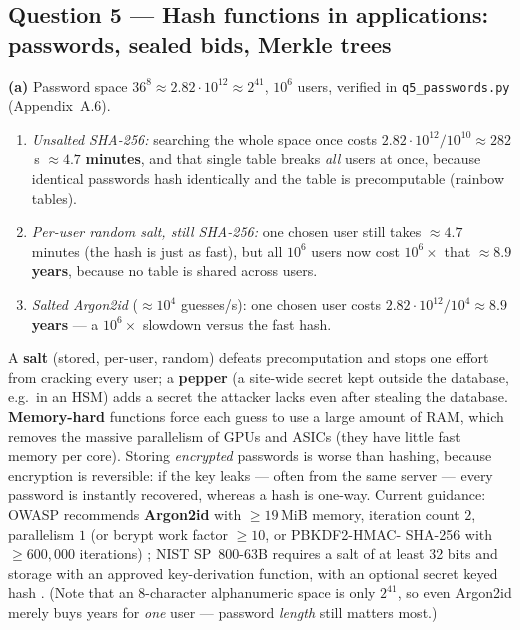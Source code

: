 \documentclass[11pt,a4paper]{article}
\begin{document}
\subsection*{Question 5 --- Hash functions in applications: passwords, sealed bids, Merkle trees}
\textbf{(a)} Password space $36^{8}\approx 2.82\cdot 10^{12}\approx 2^{41}$, $10^{6}$ users, verified in
\texttt{q5\_passwords.py} (Appendix~A.6).
\begin{enumerate}[label=(\roman*)]
\item \emph{Unsalted SHA-256:} searching the whole space once costs $2.82\cdot 10^{12}/10^{10}\approx
282$\,s $\approx \mathbf{4.7}$ \textbf{minutes}, and that single table breaks \emph{all} users at once,
because identical passwords hash identically and the table is precomputable (rainbow tables).
\item \emph{Per-user random salt, still SHA-256:} one chosen user still takes $\approx 4.7$ minutes (the
hash is just as fast), but all $10^{6}$ users now cost $10^{6}\times$ that $\approx \mathbf{8.9}$
\textbf{years}, because no table is shared across users.
\item \emph{Salted Argon2id} ($\approx 10^{4}$ guesses/s): one chosen user costs $2.82\cdot
10^{12}/10^{4}\approx \mathbf{8.9}$ \textbf{years} --- a $10^{6}\times$ slowdown versus the fast hash.
\end{enumerate}
A \textbf{salt} (stored, per-user, random) defeats precomputation and stops one effort from cracking
every user; a \textbf{pepper} (a site-wide secret kept outside the database, e.g.\ in an HSM) adds a
secret the attacker lacks even after stealing the database. \textbf{Memory-hard} functions force each
guess to use a large amount of RAM, which removes the massive parallelism of GPUs and ASICs (they have
little fast memory per core). Storing \emph{encrypted} passwords is worse than hashing, because
encryption is reversible: if the key leaks --- often from the same server --- every password is instantly
recovered, whereas a hash is one-way. Current guidance: OWASP recommends \textbf{Argon2id} with $\ge
19$\,MiB memory, iteration count $2$, parallelism $1$ (or bcrypt work factor $\ge 10$, or PBKDF2-HMAC-
SHA-256 with $\ge 600{,}000$ iterations) \cite{owasp}; NIST SP~800-63B requires a salt of at least 32
bits and storage with an approved key-derivation function, with an optional secret keyed hash
\cite{nist63b}. (Note that an 8-character alphanumeric space is only $2^{41}$, so even Argon2id merely
buys years for \emph{one} user --- password \emph{length} still matters most.)
\end{document}
